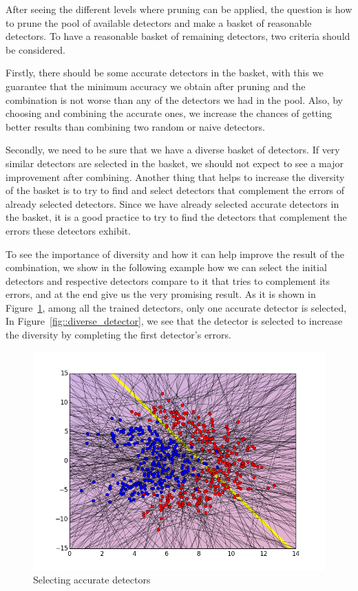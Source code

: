 After seeing the different levels where pruning can be applied, the question is how to prune the pool of available detectors and make a basket of reasonable detectors. To have a reasonable basket of remaining detectors, two criteria should be considered.  

Firstly, there should be some accurate detectors in the basket, with this we guarantee that the minimum accuracy we obtain after pruning and the combination is not worse than any of the detectors we had in the pool. Also, by choosing and combining the accurate ones, we increase the chances of getting better results than combining two random or naive detectors.  

Secondly, we need to be sure that we have a diverse basket of detectors. If very similar detectors  are selected  in the basket, we should not expect to see a major improvement after combining. Another thing that helps to increase the diversity of the basket is to try to find and select detectors that complement the errors of already selected detectors. Since we have already selected accurate detectors in the basket, it is a good practice to try to find the detectors that complement the errors these detectors exhibit. 

To see the importance of diversity and how it can help improve the result of the combination, we show in the following example how we can select the initial detectors and respective detectors compare to it that tries to complement its errors, and at the end give us the very promising result. As it is shown in Figure~\ref{fig::accurate_detector}, among all the trained detectors, only one accurate detector is selected, In Figure~\ref{fig::diverse_detector}, we see that the detector is selected to increase the diversity by completing the first detector's errors.

\begin{figure}[H]
\centering
\includegraphics[width=1\linewidth]{figs/Lithuanian/Initial_detectors}
\caption{Selecting accurate detectors}
\label{fig::accurate_detector}
\end{figure}


